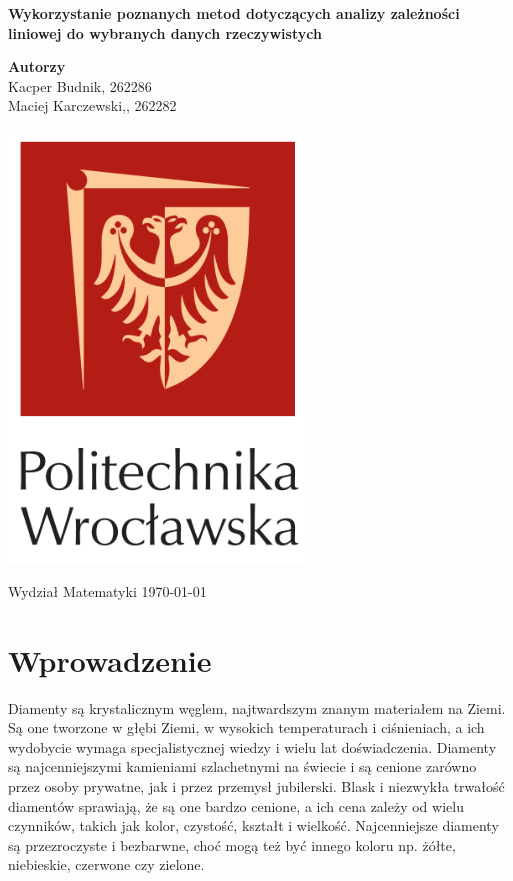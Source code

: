 \documentclass[12pt]{article}
\theoremstyle{exer}
\begin{document}
	\begin{titlepage}
		\begin{center}
			
			\textbf{\Huge  Wykorzystanie poznanych metod dotyczących analizy zależności liniowej
				do wybranych danych rzeczywistych}
			
			\vspace{0.5cm}
			
			\vspace{1.5cm}
			
			\textbf{\LARGE Autorzy}\\
			\vspace{0.5cm}
			\large Kacper Budnik, 262286\\
			\large Maciej Karczewski,, 262282\\
			
			
			\vfill
			
			\vspace{0.4cm}
			
			\includegraphics[width=0.60\textwidth]{images/logo.PNG}
			
			\vspace{0.8cm}
			Wydział Matematyki	
			\today
		\end{center}
	\end{titlepage}
	\tableofcontents
	\newpage
	
	\section{Wprowadzenie}
	Diamenty są krystalicznym węglem, najtwardszym znanym materiałem na Ziemi. Są one tworzone w głębi Ziemi, w wysokich temperaturach i ciśnieniach, a ich wydobycie wymaga specjalistycznej wiedzy i wielu lat doświadczenia. Diamenty są najcenniejszymi kamieniami szlachetnymi na świecie i są cenione zarówno przez osoby prywatne, jak i przez przemysł jubilerski. Blask i niezwykła trwałość diamentów sprawiają, że są one bardzo cenione, a ich cena zależy od wielu czynników, takich jak kolor, czystość, kształt i wielkość. Najcenniejsze diamenty są przezroczyste i bezbarwne, choć mogą też być innego koloru np.  żółte, niebieskie, czerwone czy zielone.
	
\end{document}
